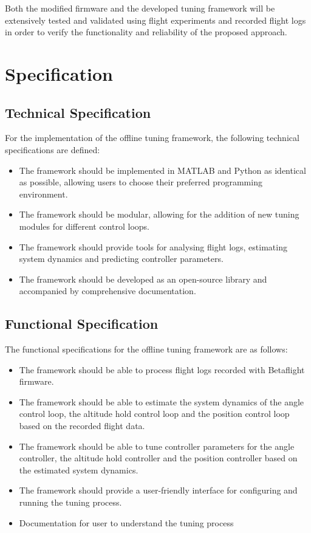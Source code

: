 \documentclass[a4paper,11pt,bibliography=totoc,listof=totoc]{scrreprt}
\begin{document}
Both the modified firmware and the developed tuning framework will be 
extensively tested and validated using flight experiments and recorded 
flight logs in order to verify the functionality and reliability of the 
proposed approach.

\newpage

\section{Specification}
\subsection{Technical Specification}

For the implementation of the offline tuning framework, the following technical
specifications are defined:
\begin{itemize}
    \item The framework should be implemented in MATLAB and Python as identical as possible, 
    allowing users to choose their preferred programming environment.
    \item The framework should be modular, allowing for the addition of new tuning modules for different control loops.
    \item The framework should provide tools for analysing flight logs, estimating system dynamics and predicting controller parameters.
    \item The framework should be developed as an open-source library and accompanied by comprehensive documentation.
\end{itemize}

\subsection{Functional Specification}
The functional specifications for the offline tuning framework are as follows:
\begin{itemize}
    \item The framework should be able to process flight logs recorded with Betaflight firmware.
    \item The framework should be able to estimate the system dynamics of the angle control loop, 
    the altitude hold control loop and the position control loop based on the recorded flight data.
    \item The framework should be able to tune controller parameters for the angle controller, 
    the altitude hold controller and the position controller based on the estimated system dynamics.
    \item The framework should provide a user-friendly interface for configuring and running 
    the tuning process.
    \item Documentation for user to understand the tuning process
\end{itemize}
\end{document}
